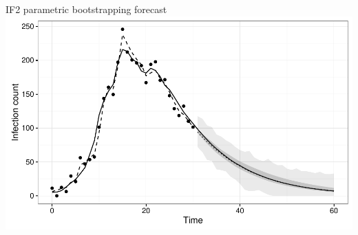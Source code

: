 \documentclass[12pt]{beamer}
\begin{document}
\begin{frame}

	\null
	\vfill
	IF2 parametric bootstrapping forecast \\
	\vspace{\baselineskip}
	\includegraphics[width=\textwidth,height=\textheight,keepaspectratio=true]{../../writing/SC2/images/if2combined}
	\vfill

\end{frame}
\end{document}
